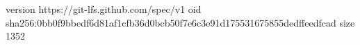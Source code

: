 version https://git-lfs.github.com/spec/v1
oid sha256:0bb0f9bbedf6d81af1cfb36d0bcb50f7e6c3e91d175531675855dedffeedfcad
size 1352
